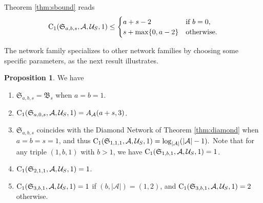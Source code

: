 \documentclass[11pt,a4paper]{article}
\theoremstyle{definition}
\newtheorem{proposition}[theorem]{Proposition}
\newcommand{\mA}{\mathcal{A}}
\newcommand{\mU}{\mathcal{U}}
\newcommand{\CC}{\textnormal{C}}
\begin{document}
Theorem \ref{thm:sbound} reads 
\begin{equation}
\label{eq:thm19_reads}
\CC_1(\mathfrak{S}_{a,b,s},\mA,\mU_S,1) \le
\begin{cases}      
      a+s-2  & \text{if } b=0, \\
      s + \max\{0,a-2\}  & \text{otherwise}. \\
\end{cases}
\end{equation}

The network family specializes to 
other network families by choosing some specific parameters, as the next result illustrates.

\begin{proposition}
\label{prop:newfamily}
We have 
\begin{enumerate}
    \item \label{item1} $\mathfrak{S}_{a,b,s} = \mathfrak{B}_s$ when $a =b=1$.
    \item \label{item2} $\CC_1(\mathfrak{S}_{a,0,s},\mA,\mU_S,1) = A_{\mA}(a+s,3)$.
    \item \label{item3} $\mathfrak{S}_{a,b,s}$ coincides with the Diamond Network of Theorem \ref{thm:diamond} when $a=b=s=1$, and thus $\CC_1(\mathfrak{S}_{1,1,1},\mA,\mU_S,1) = \log_{|\mA|}(\lvert \mA \rvert-1).$ Note that for any triple $(1,b,1)$ with $b>1$, we have $\CC_1(\mathfrak{S}_{1,b,1},\mA,\mU_S,1)=1$.
    \item \label{item4} $\CC_1(\mathfrak{S}_{2,1,1},\mA,\mU_S,1) = 1$.
    \item \label{item5} $\CC_1(\mathfrak{S}_{3,b,1},\mA,\mU_S,1) = 
    1$ if $(b,\lvert \mA \rvert)=(1,2)$, and 
    $\CC_1(\mathfrak{S}_{3,b,1},\mA,\mU_S,1) =2$ otherwise.
\end{enumerate}
\end{proposition}
\end{document}
